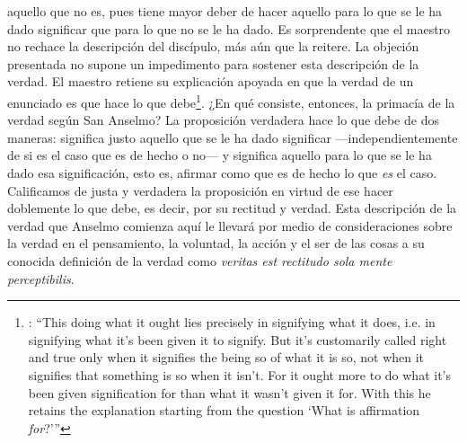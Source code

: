 aquello que no es, pues tiene mayor deber de hacer aquello para lo que se le ha dado significar que para lo que no se le ha dado. Es sorprendente que el maestro no rechace la descripción del discípulo, más aún que la reitere. La objeción presentada no supone un impedimento para sostener esta descripción de la verdad. El maestro retiene su explicación apoyada en que la verdad de un enunciado es que hace lo que debe\footnote{\cite[Cf.~][76]{anscombe2011plato:truth}: \enquote{This doing what it ought lies precisely in signifying what it does, i.e. in signifying what it's been given it to signify. But it's customarily called right and true only when it signifies the being so of what it is so, not when it signifies that something is so when it isn't. For it ought more to do what it's been given signification for than what it wasn't given it for. With this he retains the explanation starting from the question `What is affirmation \emph{for}?'}}. ¿En qué consiste, entonces, la primacía de la verdad según San Anselmo? La proposición verdadera hace lo que debe de dos maneras: significa justo aquello que se le ha dado significar ---independientemente de si es el caso que es de hecho o no--- y significa aquello para lo que se le ha dado esa significación, esto es, afirmar como que es de hecho lo que \emph{es} el caso. Calificamos de justa y verdadera la proposición en virtud de ese hacer doblemente lo que debe, es decir, por su rectitud y verdad\autocite[Cf.~][497]{anselm1952obras:deveritate}. Esta descripción de la verdad que Anselmo comienza aquí le llevará por medio de consideraciones sobre la verdad en el pensamiento, la voluntad, la acción y el ser de las cosas a su conocida definición de la verdad como \emph{veritas est rectitudo sola mente perceptibilis}\autocite[522]{anselm1952obras:deveritate}.

